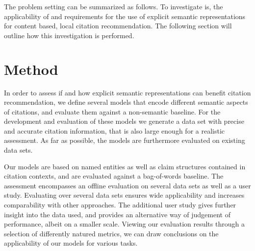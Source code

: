 The problem setting can be summarized as follows. To investigate is, the applicability of and requirements for the use of explicit semantic representations for content based, local citation recommendation. The following section will outline how this investigation is performed.

\section{Method}\label{sec:method}
In order to assess if and how explicit semantic representations can benefit citation recommendation, we define several models that encode different semantic aspects of citations, and evaluate them against a non-semantic baseline. For the development and evaluation of these models we generate a data set with precise and accurate citation information, that is also large enough for a realistic assessment. As far as possible, the models are furthermore evaluated on existing data sets.

Our models are based on named entities as well as claim structures contained in citation contexts, and are evaluated against a bag-of-words baseline. The assessment encompasses an offline evaluation on several data sets as well as a user study. Evaluating over several data sets ensures wide applicability and increases comparability with other approaches. The additional user study gives further insight into the data used, and provides an alternative way of judgement of performance, albeit on a smaller scale. Viewing our evaluation results through a selection of differently natured metrics, we can draw conclusions on the applicability of our models for various tasks.

